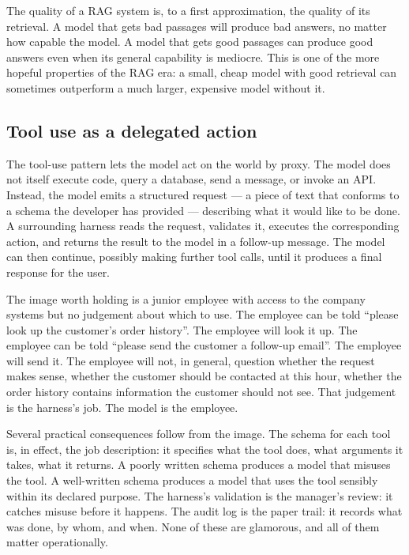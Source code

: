 The quality of a RAG system is, to a first approximation, the
quality of its retrieval. A model that gets bad passages will
produce bad answers, no matter how capable the model. A model
that gets good passages can produce good answers even when
its general capability is mediocre. This is one of the more
hopeful properties of the RAG era: a small, cheap model with
good retrieval can sometimes outperform a much larger,
expensive model without it.

\subsection*{Tool use as a delegated action}

The tool-use pattern lets the model act on the world by
proxy. The model does not itself execute code, query a
database, send a message, or invoke an API. Instead, the model
emits a structured request --- a piece of text that conforms
to a schema the developer has provided --- describing what it
would like to be done. A surrounding harness reads the
request, validates it, executes the corresponding action, and
returns the result to the model in a follow-up message. The
model can then continue, possibly making further tool calls,
until it produces a final response for the user.

The image worth holding is a junior employee with access to
the company systems but no judgement about which to use. The
employee can be told ``please look up the customer's order
history''. The employee will look it up. The employee can be
told ``please send the customer a follow-up email''. The
employee will send it. The employee will not, in general,
question whether the request makes sense, whether the customer
should be contacted at this hour, whether the order history
contains information the customer should not see. That
judgement is the harness's job. The model is the employee.

Several practical consequences follow from the image. The
schema for each tool is, in effect, the job description: it
specifies what the tool does, what arguments it takes, what it
returns. A poorly written schema produces a model that misuses
the tool. A well-written schema produces a model that uses the
tool sensibly within its declared purpose. The harness's
validation is the manager's review: it catches misuse before
it happens. The audit log is the paper trail: it records what
was done, by whom, and when. None of these are glamorous, and
all of them matter operationally.

